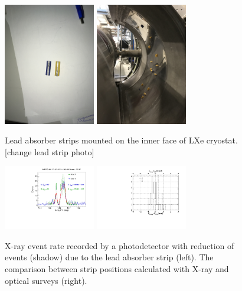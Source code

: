 \begin{figure}[]
\includegraphics[width=4cm,angle=90]{plots/LeadStrips}
\includegraphics[width=4cm,angle=90]{plots/MountedLeadStrips}
\caption{Lead absorber strips mounted on the inner face
of LXe cryostat. [change lead strip photo]}
\label{fig:lead1} 
\end{figure}
\begin{figure}[]
\includegraphics[width=4cm]{plots/2018/c941}
\includegraphics[width=4cm]{plots/2018/dzdphi_lead}
\caption{X-ray event rate recorded by a photodetector 
with reduction of events (shadow) due to the lead absorber strip
(left). The  comparison between strip positions calculated
with X-ray and optical surveys (right). }
\label{fig:lead2} 
\end{figure}

